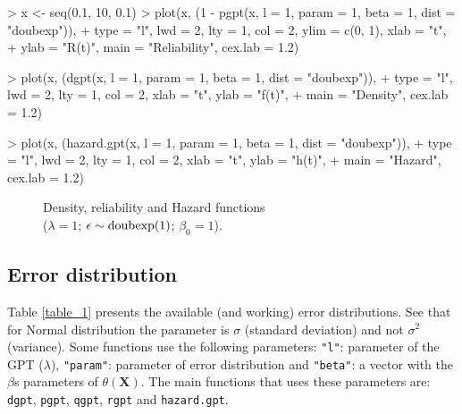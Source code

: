 \documentclass[nogin,letterpaper,12pt]{article}
\begin{document}
\begin{Example}
\begin{Schunk}
\begin{Sinput}
> x <- seq(0.1, 10, 0.1)
> plot(x, (1 - pgpt(x, l = 1, param = 1, beta = 1, dist = "doubexp")), 
+     type = "l", lwd = 2, lty = 1, col = 2, ylim = c(0, 1), xlab = "t", 
+     ylab = "R(t)", main = "Reliability", cex.lab = 1.2)
\end{Sinput}
\end{Schunk}
\begin{Schunk}
\begin{Sinput}
> plot(x, (dgpt(x, l = 1, param = 1, beta = 1, dist = "doubexp")), 
+     type = "l", lwd = 2, lty = 1, col = 2, xlab = "t", ylab = "f(t)", 
+     main = "Density", cex.lab = 1.2)
\end{Sinput}
\end{Schunk}
\begin{Schunk}
\begin{Sinput}
> plot(x, (hazard.gpt(x, l = 1, param = 1, beta = 1, dist = "doubexp")), 
+     type = "l", lwd = 2, lty = 1, col = 2, xlab = "t", ylab = "h(t)", 
+     main = "Hazard", cex.lab = 1.2)
\end{Sinput}
\end{Schunk}

\begin{figure}[ht!]
\centering
\captionsetup{justification=centering}
\caption{Density, reliability and Hazard functions \\ ($\lambda = 1$; $\epsilon \sim \textnormal{doubexp}(1)$; $\beta_0 = 1$).}
\label{figdoubexp}
\end{figure}

\end{Example}

\subsection{Error distribution}

Table \ref{table_1} presents the available (and working) error distributions. See that for Normal distribution the parameter is $\sigma$ (standard deviation) and not $\sigma^2$ (variance). Some functions use the following parameters: \verb="l"=: parameter of the GPT ($\lambda$), \verb="param"=: parameter of error distribution and \verb="beta"=: a vector with the $\beta$s parameters of $\theta(\mathbf{X})$. The main functions that uses these parameters are: \verb=dgpt=, \verb=pgpt=, \verb=qgpt=, \verb=rgpt= and \verb=hazard.gpt=.
\end{document}
